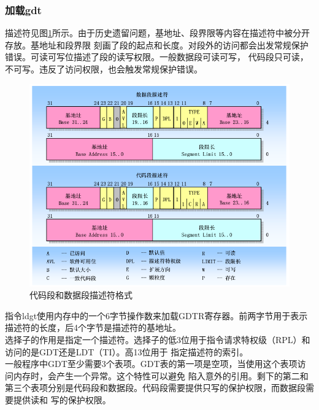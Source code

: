 \documentclass[a4paper]{article}
\begin{document}
        \subsubsection{加载gdt}
        描述符见图\ref{fig:segment}所示。由于历史遗留问题，基地址、段界限等内容在描述符中被分开存放。基地址和段界限
        刻画了段的起点和长度。对段外的访问都会出发常规保护错误。可读可写位描述了段的读写权限。一般数据段可读可写，
        代码段只可读，不可写。违反了访问权限，也会触发常规保护错误。\\ 

        \begin{figure}[!hbt]
            \begin{center}
            \includegraphics[scale=0.6]{assets/segment.png}
            \caption{代码段和数据段描述符格式\label{fig:segment}} 
            \end{center} 
        \end{figure} 

        指令ldgt使用内存中的一个6字节操作数来加载GDTR寄存器。前两字节用于表示描述符的长度，后4个字节是描述符的基地址。\\

        选择子的作用是指定一个描述符。选择子的低3位用于指令请求特权级（RPL）和访问的是GDT还是LDT（TI）。高13位用于
        指定描述符的索引。\\ 

        一般程序中GDT至少需要3个表项。GDT表的第一项是空项，当使用这个表项访问内存时，会产生一个异常。这个特性可以避免
        陷入意外的引用。剩下的第二和第三个表项分别是代码段和数据段。代码段需要提供只写的保护权限，而数据段需要提供读和
        写的保护权限。\\ 
\end{document}
